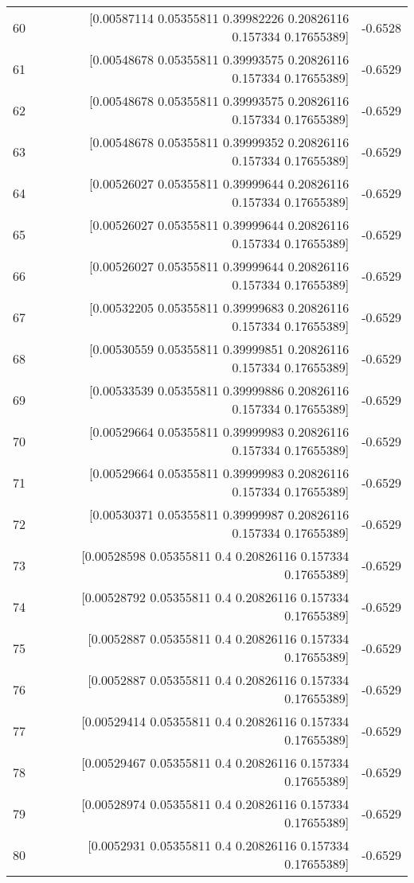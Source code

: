 \begin{longtable}{lrr}
60 & [0.00587114 0.05355811 0.39982226 0.20826116 0.157334   0.17655389] & -0.6528 \\
61 & [0.00548678 0.05355811 0.39993575 0.20826116 0.157334   0.17655389] & -0.6529 \\
62 & [0.00548678 0.05355811 0.39993575 0.20826116 0.157334   0.17655389] & -0.6529 \\
63 & [0.00548678 0.05355811 0.39999352 0.20826116 0.157334   0.17655389] & -0.6529 \\
64 & [0.00526027 0.05355811 0.39999644 0.20826116 0.157334   0.17655389] & -0.6529 \\
65 & [0.00526027 0.05355811 0.39999644 0.20826116 0.157334   0.17655389] & -0.6529 \\
66 & [0.00526027 0.05355811 0.39999644 0.20826116 0.157334   0.17655389] & -0.6529 \\
67 & [0.00532205 0.05355811 0.39999683 0.20826116 0.157334   0.17655389] & -0.6529 \\
68 & [0.00530559 0.05355811 0.39999851 0.20826116 0.157334   0.17655389] & -0.6529 \\
69 & [0.00533539 0.05355811 0.39999886 0.20826116 0.157334   0.17655389] & -0.6529 \\
70 & [0.00529664 0.05355811 0.39999983 0.20826116 0.157334   0.17655389] & -0.6529 \\
71 & [0.00529664 0.05355811 0.39999983 0.20826116 0.157334   0.17655389] & -0.6529 \\
72 & [0.00530371 0.05355811 0.39999987 0.20826116 0.157334   0.17655389] & -0.6529 \\
73 & [0.00528598 0.05355811 0.4        0.20826116 0.157334   0.17655389] & -0.6529 \\
74 & [0.00528792 0.05355811 0.4        0.20826116 0.157334   0.17655389] & -0.6529 \\
75 & [0.0052887  0.05355811 0.4        0.20826116 0.157334   0.17655389] & -0.6529 \\
76 & [0.0052887  0.05355811 0.4        0.20826116 0.157334   0.17655389] & -0.6529 \\
77 & [0.00529414 0.05355811 0.4        0.20826116 0.157334   0.17655389] & -0.6529 \\
78 & [0.00529467 0.05355811 0.4        0.20826116 0.157334   0.17655389] & -0.6529 \\
79 & [0.00528974 0.05355811 0.4        0.20826116 0.157334   0.17655389] & -0.6529 \\
80 & [0.0052931  0.05355811 0.4        0.20826116 0.157334   0.17655389] & -0.6529 \\

\end{longtable}
